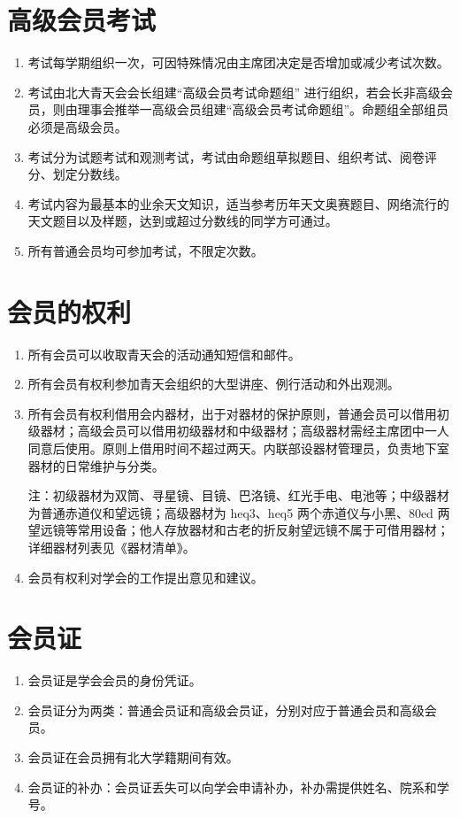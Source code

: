 \section{高级会员考试}

\begin{enumerate}[resume]
    \item 考试每学期组织一次，可因特殊情况由主席团决定是否增加或减少考试次数。
    
    \item 考试由北大青天会会长组建“高级会员考试命题组” 进行组织，若会长非高级会员，则由理事会推举一高级会员组建“高级会员考试命题组”。命题组全部组员必须是高级会员。
    
    \item 考试分为试题考试和观测考试，考试由命题组草拟题目、组织考试、阅卷评分、划定分数线。
    
    \item 考试内容为最基本的业余天文知识，适当参考历年天文奥赛题目、网络流行的天文题目以及样题，达到或超过分数线的同学方可通过。
    
    \item 所有普通会员均可参加考试，不限定次数。
\end{enumerate}

\section{会员的权利}

\begin{enumerate}[resume]
    \item 所有会员可以收取青天会的活动通知短信和邮件。
    
    \item 所有会员有权利参加青天会组织的大型讲座、例行活动和外出观测。
    
    \item 所有会员有权利借用会内器材，出于对器材的保护原则，普通会员可以借用初级器材；高级会员可以借用初级器材和中级器材；高级器材需经主席团中一人同意后使用。原则上借用时间不超过两天。内联部设器材管理员，负责地下室器材的日常维护与分类。
    
    注：初级器材为双筒、寻星镜、目镜、巴洛镜、红光手电、电池等；中级器材为普通赤道仪和望远镜；高级器材为 heq3、heq5 两个赤道仪与小黑、80ed 两望远镜等常用设备；他人存放器材和古老的折反射望远镜不属于可借用器材；详细器材列表见《器材清单》。
    
    \item 会员有权利对学会的工作提出意见和建议。
\end{enumerate}

\section{会员证}

\begin{enumerate}[resume]
    \item 会员证是学会会员的身份凭证。
    
    \item 会员证分为两类：普通会员证和高级会员证，分别对应于普通会员和高级会员。
    
    \item 会员证在会员拥有北大学籍期间有效。
    
    \item 会员证的补办：会员证丢失可以向学会申请补办，补办需提供姓名、院系和学号。
\end{enumerate}
